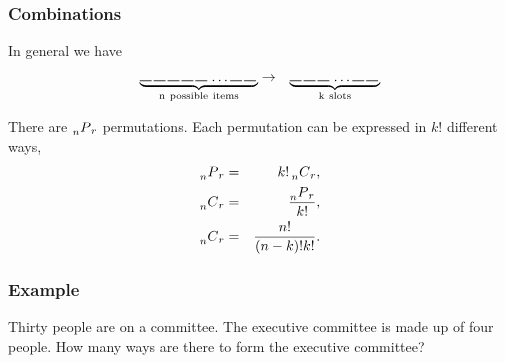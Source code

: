 \begin{frame}
  \frametitle{Combinations}

  In general we have 
  \begin{eqnarray*}
    \underbrace{
      \rule{.3cm}{.2mm} \hspace{.05cm} 
      \rule{.3cm}{.2mm} \hspace{.05cm} 
      \rule{.3cm}{.2mm} \hspace{.05cm} 
      \rule{.3cm}{.2mm} \hspace{.05cm} 
      \rule{.3cm}{.2mm} \hspace{.05cm} \ldots
      \rule{.3cm}{.2mm} \hspace{.05cm} 
      \rule{.3cm}{.2mm} \hspace{.05cm}}_{\mathrm{n~possible~items}}
    & \rightarrow & 
    \underbrace{
      \rule{.3cm}{.2mm} \hspace{.05cm} 
      \rule{.3cm}{.2mm} \hspace{.05cm} 
      \rule{.3cm}{.2mm} \hspace{.05cm} \ldots
      \rule{.3cm}{.2mm} \hspace{.05cm} 
      \rule{.3cm}{.2mm} \hspace{.05cm}}_{\mathrm{k~slots}}
  \end{eqnarray*}

  {

    There are $\prescript{~}{n}{P}_r$ permutations. Each permutation
    can be expressed in $k!$ different ways,
    \begin{eqnarray*}
      \prescript{~}{n}{P}_r & = & k! \prescript{~}{n}{C}_r, \\
      \prescript{~}{n}{C}_r & = & \frac{\prescript{~}{n}{P}_r}{k!}, \\
      \prescript{~}{n}{C}_r & = & \frac{n!}{(n-k)!k!}.
    \end{eqnarray*}
  }
  
\end{frame}

\begin{frame}
  \frametitle{Example}
  Thirty people are on a committee. The executive committee is made up
  of four people. How many ways are there to form the executive
  committee?
  
\end{frame}

